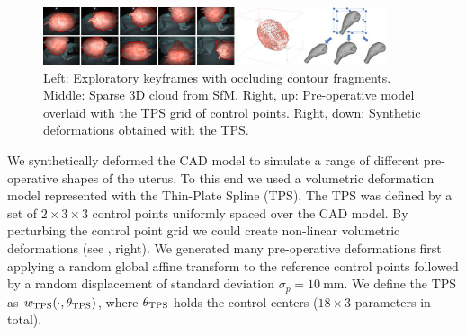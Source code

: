 \begin{figure}[htb]
  \centering
  \includegraphics[width=0.9\textwidth]{./figs/markupWithDefSimCompressed.pdf}
\caption{Left: Exploratory keyframes with occluding contour fragments. Middle: Sparse 3D cloud from SfM. Right, up: Pre-operative model overlaid with the TPS grid of control points. Right, down: Synthetic deformations obtained with the TPS.}
\label{fig:reconstruction}
\end{figure}

We synthetically deformed the CAD model to simulate a range of different pre-operative shapes of the uterus. To this end we used a volumetric deformation model represented with the Thin-Plate Spline (TPS). The TPS was defined by a set of $2\times 3 \times 3$ control points uniformly spaced over the CAD model. By perturbing the control point grid we could create non-linear volumetric deformations (see , right). We generated many pre-operative deformations first applying a random global affine transform to the reference control points followed by a random displacement of standard deviation $\sigma_p=\SI{10}{\milli\metre}$. We define the TPS as $w_{\text{TPS}}(\cdot,\theta_{\text{TPS}})$, where $\theta_{\text{TPS}}$ holds the control centers (\ie $18\times 3$ parameters in total).

